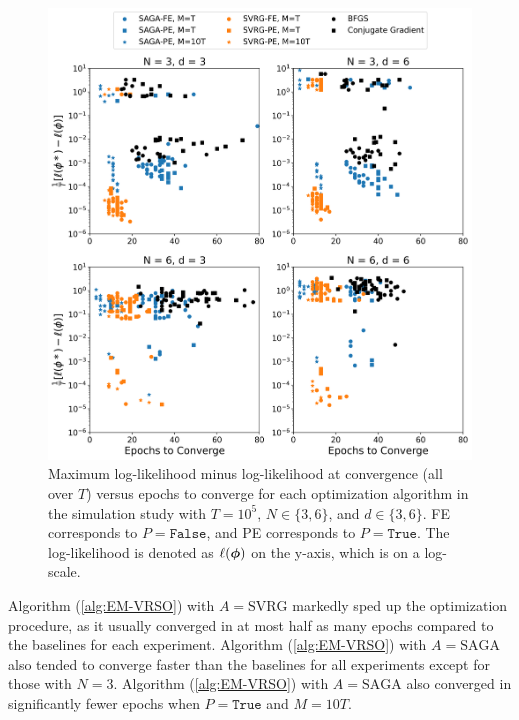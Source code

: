 \begin{figure}%
    \centering
    \includegraphics[width=5.5in]{../plt/scatter_sim_T_100000.png}
    \caption{Maximum log-likelihood minus log-likelihood at convergence (all over $T$) versus epochs to converge for each optimization algorithm in the simulation study with $T=10^{5}$, $N \in \{3,6\}$, and $d \in \{3,6\}$. FE corresponds to $P = \texttt{False}$, and PE corresponds to $P = \texttt{True}$.
    The log-likelihood is denoted as $\ell(\boldsymbol{\phi})$ on the y-axis, which is on a log-scale.}
    \label{fig:scatter_sim}
\end{figure}
%
Algorithm (\ref{alg:EM-VRSO}) with $A=\text{SVRG}$ markedly sped up the optimization procedure, as it usually converged in at most half as many epochs compared to the baselines for each experiment. Algorithm (\ref{alg:EM-VRSO}) with $A=\text{SAGA}$ also tended to converge faster than the baselines for all experiments except for those with $N=3$. Algorithm (\ref{alg:EM-VRSO}) with $A=\text{SAGA}$ also converged in significantly fewer epochs when $P = \texttt{True}$ and $M=10T$. 
